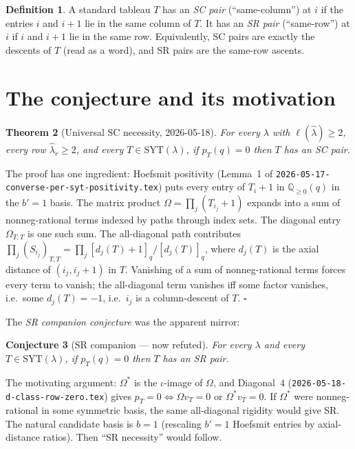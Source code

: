 \documentclass[11pt]{article}
\newtheorem{theorem}{Theorem}
\newtheorem{conjecture}[theorem]{Conjecture}
\theoremstyle{definition}
\newtheorem{definition}[theorem]{Definition}
\newcommand{\Om}{\Omega}
\newcommand{\Omstar}{\Omega^{\!*}}
\newcommand{\la}{\lambda}
\newcommand{\hla}{\hat{\lambda}}
\newcommand{\SYT}{\mathrm{SYT}}
\newcommand{\QQ}{\mathbb{Q}}
\begin{document}
\begin{definition}\label{def:scsr}
A standard tableau $T$ has an \emph{SC pair} (``same-column'') at $i$ if
the entries $i$ and $i+1$ lie in the same column of $T$. It has an
\emph{SR pair} (``same-row'') at $i$ if $i$ and $i+1$ lie in the same row.
Equivalently, SC pairs are exactly the descents of $T$ (read as a word),
and SR pairs are the same-row ascents.
\end{definition}

\section{The conjecture and its motivation}

\begin{theorem}[Universal SC necessity, 2026-05-18]\label{thm:sc}
For every $\la$ with $\ell(\hla) \ge 2$, every row $\hla_r \ge 2$, and every
$T \in \SYT(\la)$, if $p_T(q) = 0$ then $T$ has an SC pair.
\end{theorem}

The proof has one ingredient: Hoefsmit positivity (Lemma~1 of
\texttt{2026-05-17-converse-per-syt-positivity.tex}) puts every entry of
$T_i + 1$ in $\QQ_{\ge 0}(q)$ in the $b' = 1$ basis. The matrix product
$\Om = \prod_j (T_{i_j} + 1)$ expands into a sum of nonneg-rational
terms indexed by paths through index sets. The diagonal entry $\Om_{T,T}$
is one such sum. The all-diagonal path contributes
$\prod_j (S_{i_j})_{T,T} = \prod_j [d_j(T) + 1]_q / [d_j(T)]_q$,
where $d_j(T)$ is the axial distance of $(i_j, i_j + 1)$ in $T$. Vanishing
of a sum of nonneg-rational terms forces every term to vanish; the
all-diagonal term vanishes iff some factor vanishes, i.e.\ some
$d_j(T) = -1$, i.e.\ $i_j$ is a column-descent of $T$. \hfill$\square$

The \emph{SR companion conjecture} was the apparent mirror:

\begin{conjecture}[SR companion --- now refuted]\label{conj:sr}
For every $\la$ and every $T \in \SYT(\la)$, if $p_T(q) = 0$ then $T$ has
an SR pair.
\end{conjecture}

The motivating argument: $\Omstar$ is the $\iota$-image of $\Om$, and
Diagonal~4 (\texttt{2026-05-18-d-class-row-zero.tex}) gives
$p_T = 0 \iff \Om v_T = 0$ or $\Omstar v_T = 0$. If $\Omstar$ were
nonneg-rational in some symmetric basis, the same all-diagonal rigidity
would give SR. The natural candidate basis is $b = 1$ (rescaling
$b' = 1$ Hoefsmit entries by axial-distance ratios). Then ``SR necessity''
would follow.
\end{document}
